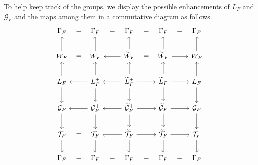 \documentclass[preprint,12pt, leqno]{elsarticle}
\newcommand{\UGal}{\mathcal{G}_F}
\newcommand{\cT}{\mathcal{T}}
\numberwithin{equation}{section}
\theoremstyle{named}
\begin{document}
To help keep track of the groups, we display the possible enhancements of $L_F$ and $\UGal$ and the maps among them in a commutative diagram as follows.
\begin{equation*}
    \begin{tikzcd}
       \Gamma_F \ar[r, phantom, "="] & \Gamma_F \ar[r, phantom, "="] & \Gamma_F \ar[r, phantom, "="] & \Gamma_F \ar[r, phantom, "="] & \Gamma_F \\
       W_F \ar[r, phantom, "="]\ar[u] & W_F \ar[u] & \widetilde{W}_F\ar[l]\ar[r, phantom, "="] \ar[u]& \widetilde{W}_F\ar[u]\ar[r] & W_F \ar[u]\\
        L_F \ar[u]\ar[d] & L_F^+\ar[u]\ar[d] \ar[l]& \widetilde{L}_F^+\ar[u]\ar[d]\ar[l] \ar{r} & \widetilde{L}_F\ar[u]\ar[d]\ar[r] & L_F\ar[u]\ar[d] \\
        \UGal \ar[d] & \UGal^+\ar[d]\ar[l] & \widetilde{\mathcal{G}}_F^+\ar[l]\ar[r]\ar[d] & \widetilde{\mathcal{G}}_F\ar[d]\ar[r] & \UGal \ar[d] \\
        \cT_F \ar[r, phantom, "="]\ar[d] & \cT_F\ar[d] & \widetilde{\cT}_F\ar[d]\ar[r]\ar[l] & \widetilde{\cT}_F\ar[d]\ar[r] & \cT_F\ar[d]\\
         \Gamma_F \ar[r, phantom, "="]& \Gamma_F \ar[r, phantom, "="] & \Gamma_F \ar[r, phantom, "="] & \Gamma_F  \ar[r, phantom, "="]& \Gamma_F
    \end{tikzcd}
\end{equation*}




\end{document}
